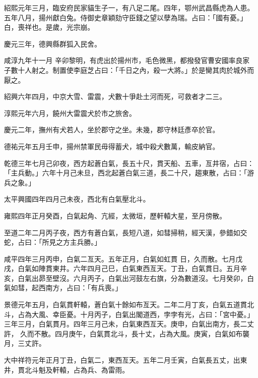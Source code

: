 \begin{pinyinscope}
 紹熙元年三月，臨安府民家貓生子一，有八足二尾。四年，鄂州武昌縣虎為人患。五年八月，揚州獻白兔。侍御史章穎劾守臣錢之望以孽為瑞。占曰：「國有憂。」白，喪祥也。是歲，光宗崩。



 慶元三年，德興縣群狐入民舍。



 咸淳九年十一月
 辛卯黎明，有虎出於揚州市，毛色微黑，都撥發官曹安國率良家子數十人射之。制置使李庭芝占曰：「千日之內，殺一大將。」於是臠其肉於城外而厭之。



 紹興六年四月，中京大雪、雷震，犬數十爭赴土河而死，可救者才二三。



 淳熙元年六月，饒州大雷震犬於市之旅舍。



 慶元二年，撫州有犬若人，坐於郡守之坐。未幾，郡守林廷彥卒於官。



 德祐元年五月壬申，揚州禁軍民毋得蓄犬，城中殺犬數萬，輸皮納官。



 乾德三年七月己卯夜，西方起蒼白氣，長五十尺，貫天船、五車，亙井宿，占曰：「主兵動。」六年十月己未旦，西北起蒼白氣三道，長二十尺，趨東散，占曰：「游兵之象。」



 太平興國四年四月己未夜，西北有白氣壓北斗。



 雍熙四年正月癸酉，白氣起角、亢經，太微垣，歷軒轅大星，至月傍散。



 至道二年二月丙子夜，西方有蒼白氣，長短八道，如彗掃稍，經天漢，參錯如交蛇，占曰：「所見之方主兵勝。」



 咸平四年三月丙申，白氣二亙天。五年正月，白氣如虹貫
 日，久而散。七月戊戌，白氣如陣貫東井。六年四月己巳，白氣東西亙天。丁丑，白氣貫日。五月辛亥，白氣出昴至壁沒。六月丙子，白氣出河鼓左右旗，分為數道沒。七月癸卯，白氣如彗，起西南方，占曰：「有兵喪。」



 景德元年五月，白氣貫軒轅，蒼白氣十餘如布亙天。二年二月丁亥，白氣五道貫北斗，占為大風、幸臣憂。十月丙子，白氣出閣道西，孛孛有光，占曰：「宮中憂。」三年三月，白氣貫月。四年三月己未，白氣東西亙天。庚申，白氣出南方，長二丈許，
 久而不散。四月庚午，白氣貫北斗，長十丈，占為大風。庚寅，白氣如布襲月，三丈許。



 大中祥符元年正月丁丑，白氣二，東西亙天。五年二月壬寅，白氣長五丈，出東井，貫北斗魁及軒轅，占為兵、為雷雨。




\end{pinyinscope}
